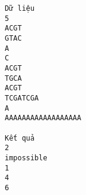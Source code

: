 \begin{verbatim}
Dữ liệu
5
ACGT
GTAC
A
C
ACGT
TGCA
ACGT
TCGATCGA
A
AAAAAAAAAAAAAAAAAA

Kết quả
2
impossible
1
4
6
\end{verbatim}